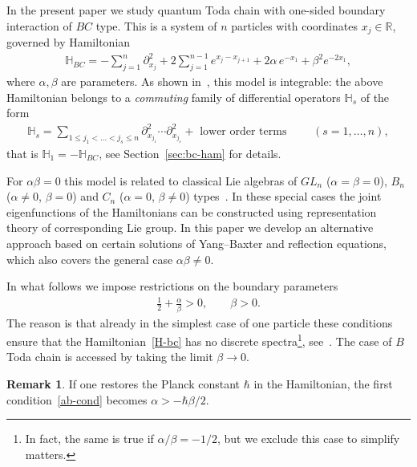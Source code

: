 \documentclass[11pt]{article}
\numberwithin{equation}{section}
\theoremstyle{plain}
\theoremstyle{definition}
\newtheorem{remark}{Remark}
\begin{document}
In the present paper we study quantum Toda chain with one-sided boundary interaction of $BC$ type. This is a system of $n$ particles with coordinates $x_j \in \mathbb{R}$, governed by Hamiltonian
\begin{align} \label{H-bc}
	\mathbb{H}_{BC} = - \sum_{j = 1}^n \partial_{x_j}^2 + 2 \sum_{j = 1}^{n - 1} e^{x_j - x_{j + 1}} + 2\alpha \, e^{-x_1} + \beta^2 e^{-2x_1},
\end{align}
where $\alpha, \beta$ are parameters. As shown in~\cite{Skl, I}, this model is integrable: the above Hamiltonian belongs to a \textit{commuting} family of differential operators $\mathbb{H}_s$ of the form
\begin{align} \label{H-bc-s}
	\mathbb{H}_s = \sum_{1 \leq j_1 < \ldots < j_s \leq n} \partial_{x_{j_1}}^2 \cdots \partial_{x_{j_s}}^2 + \text{ lower order terms } \qquad (s = 1, \ldots, n),
\end{align}
that is $\mathbb{H}_1 = - \mathbb{H}_{BC}$, see Section~\ref{sec:bc-ham} for details.

For $\alpha \beta = 0$ this model is related to classical Lie algebras of $GL_n$ ($\alpha = \beta = 0$), $B_n$ ($\alpha \not= 0$, $\beta =0$) and $C_n$ ($\alpha = 0$, $\beta \not= 0$) types~\cite{Kost}. In these special cases the joint eigenfunctions of the Hamiltonians can be constructed using representation theory of corresponding Lie group. In this paper we develop an alternative approach based on certain solutions of Yang--Baxter and reflection equations, which also covers the general case $\alpha \beta \not=0$.

In what follows we impose restrictions on the boundary parameters
\begin{align} \label{ab-cond}
	\frac{1}{2} + \frac{\alpha}{\beta} > 0, \qquad \beta > 0.
\end{align}
The reason is that already in the simplest case of one particle these conditions ensure that the Hamiltonian~\eqref{H-bc} has no discrete spectra\footnote{In fact, the same is true if $\alpha/\beta = -1/2$, but we exclude this case to simplify matters.}, see~\cite[Theorem 4.3]{DL}. The case of $B$ Toda chain is accessed by taking the limit $\beta \to 0$.

\begin{remark}
	If one restores the Planck constant $\hbar$ in the Hamiltonian, the first condition~\eqref{ab-cond} becomes $\alpha > - \hbar \beta/2$. 
\end{remark}
\end{document}
